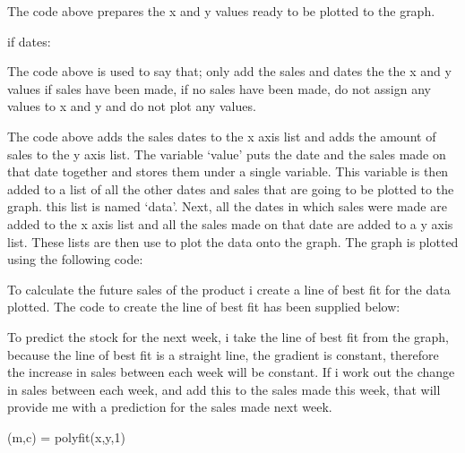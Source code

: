 
\pagebreak


The code above prepares the x and y values ready to be plotted to the graph.

\begin{python}
if dates:
\end{python}

The code above is used to say that; only add the sales and dates the the x and y values if sales have been made, if no sales have been made, do not assign any values to x and y and do not plot any values.


The code above adds the sales dates to the x axis list and adds the amount of sales to the y axis list. The variable `value' puts the date and the sales made on that date together and stores them under a single variable. This variable is then added to a list of all the other dates and sales that are going to be plotted to the graph. this list is named `data'. Next, all the dates in which sales were made are added to the x axis list and all the sales made on that date are added to a y axis list. These lists are then use to plot the data onto the graph. The graph is plotted using the following code:


To calculate the future sales of the product i create a line of best fit for the data plotted. The code to create the line of best fit has been supplied below:


To predict the stock for the next week, i take the line of best fit from the graph, because the line of best fit is  a straight line, the gradient is constant, therefore the increase in sales between each week will be constant. If i work out the change in sales between each week, and add this to the sales made this week, that will provide me with a prediction for the sales made next week. 

\begin{python}
(m,c) = polyfit(x,y,1)
\end{python}

